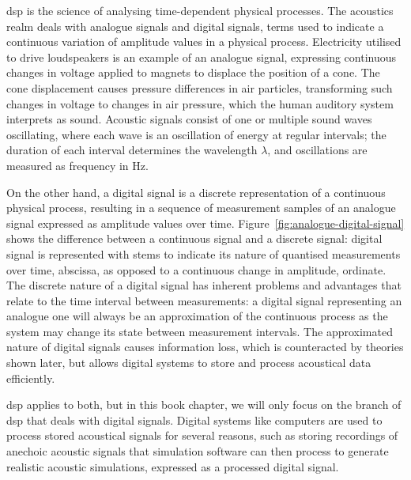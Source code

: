 \acrfull{dsp} is the science of analysing time-dependent physical processes. The acoustics realm deals with analogue signals and digital signals, terms used to indicate a continuous variation of amplitude values in a physical process. Electricity utilised to drive loudspeakers is an example of an analogue signal, expressing continuous changes in voltage applied to magnets to displace the position of a cone. The cone displacement causes pressure differences in air particles, transforming such changes in voltage to changes in air pressure, which the human auditory system interprets as sound. Acoustic signals consist of one or multiple sound waves oscillating, where each wave is an oscillation of energy at regular intervals; the duration of each interval determines the wavelength $\lambda$, and oscillations are measured as frequency in \unit{\hertz}. \par
On the other hand, a digital signal is a discrete representation of a continuous physical process, resulting in a sequence of measurement samples of an analogue signal expressed as amplitude values over time. Figure~\ref{fig:analogue-digital-signal} shows the difference between a continuous signal and a discrete signal: digital signal is represented with stems to indicate its nature of quantised measurements over time, abscissa, as opposed to a continuous change in amplitude, ordinate. The discrete nature of a digital signal has inherent problems and advantages that relate to the time interval between measurements: a digital signal representing an analogue one will always be an approximation of the continuous process as the system may change its state between measurement intervals. The approximated nature of digital signals causes information loss, which is counteracted by theories shown later, but allows digital systems to store and process acoustical data efficiently.\par
\acrshort{dsp} applies to both, but in this book chapter, we will only focus on the branch of \acrshort{dsp} that deals with digital signals. Digital systems like computers are used to process stored acoustical signals for several reasons, such as storing recordings of anechoic acoustic signals that simulation software can then process to generate realistic acoustic simulations, expressed as a processed digital signal. \par
